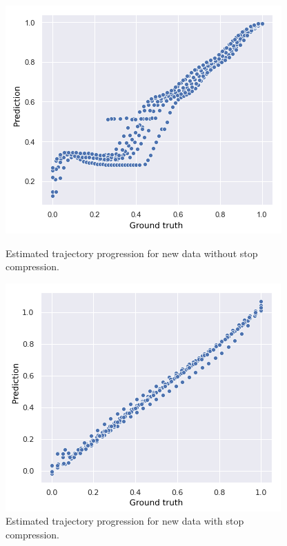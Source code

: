 \begin{figure}[H]
  \begin{minipage}{.46\textwidth}
    \includegraphics[scale=0.48,width=\textwidth]{figures/traj-without-stop-compression3.png}
    \caption{Estimated trajectory progression for new data without stop compression.}
    \label{fig:progression-without-stop-compression}
  \end{minipage}
  \hspace{5pt}
  \begin{minipage}{.46\textwidth}
    \includegraphics[scale=0.5,width=\textwidth]{figures/traj-with-stop-compression3.png}
    \caption{Estimated trajectory progression for new data with stop compression.}
    \label{fig:progression-with-stop-compression}
  \end{minipage}
\end{figure}

